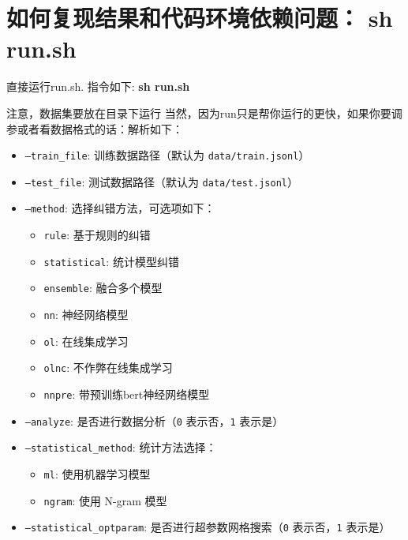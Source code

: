 \documentclass[answers]{exam}  %
\begin{document}
\section{如何复现结果和代码环境依赖问题： sh run.sh}

直接运行run.sh. 指令如下:
\textbf{sh run.sh}

注意，数据集要放在目录下运行
当然，因为run只是帮你运行的更快，如果你要调参或者看数据格式的话：解析如下：

\begin{itemize}
    \item \texttt{--train\_file}: 训练数据路径（默认为 \texttt{data/train.jsonl}）
    \item \texttt{--test\_file}: 测试数据路径（默认为 \texttt{data/test.jsonl}）
    \item \texttt{--method}: 选择纠错方法，可选项如下：
    \begin{itemize}
        \item \texttt{rule}: 基于规则的纠错
        \item \texttt{statistical}: 统计模型纠错
        \item \texttt{ensemble}: 融合多个模型
        \item \texttt{nn}: 神经网络模型
        \item \texttt{ol}: 在线集成学习
        \item \texttt{olnc}: 不作弊在线集成学习
        \item \texttt{nnpre}: 带预训练bert神经网络模型
    \end{itemize}
    \item \texttt{--analyze}: 是否进行数据分析（\texttt{0} 表示否，\texttt{1} 表示是）
    \item \texttt{--statistical\_method}: 统计方法选择：
    \begin{itemize}
        \item \texttt{ml}: 使用机器学习模型
        \item \texttt{ngram}: 使用 N-gram 模型
    \end{itemize}
    \item \texttt{--statistical\_optparam}: 是否进行超参数网格搜索（\texttt{0} 表示否，\texttt{1} 表示是）
\end{itemize}
\end{document}
